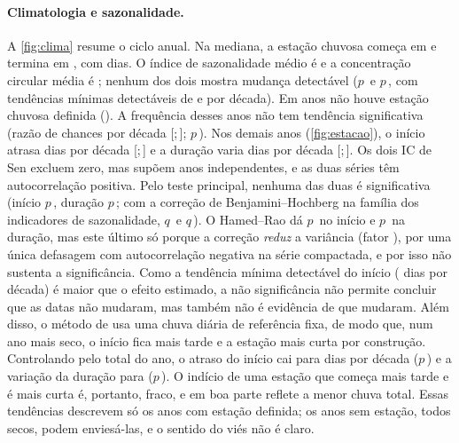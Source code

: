 \documentclass[11pt,a4paper]{article}
\newcommand{\IC}[2]{[#1;\,#2]}            %
\begin{document}
\paragraph{Climatologia e sazonalidade.} A \cref{fig:clima} resume o ciclo anual. Na mediana,
a estação chuvosa começa em \InicioMediano{} e termina em \FimMediano{}, com \DuracaoMediana{}
dias. O índice de sazonalidade médio é \SIMedio{} e a concentração circular média é
\ConcMedia{}; nenhum dos dois mostra mudança detectável ($p$\,\PTFPWSI{} e $p$\,\PTFPWConc, com
tendências mínimas detectáveis de \MDTSI{} e \MDTConc{} por década). Em \NanosSemEstacao{} anos não houve
estação chuvosa definida (\AnosSemEstacao). A frequência desses anos não tem tendência significativa
(razão de chances \ORSemEstacao{} por década \IC{\ORSemEstacaoICinf}{\ORSemEstacaoICsup};
$p$\,\PSemEstacao). Nos demais anos (\cref{fig:estacao}), o início atrasa \SenInicio{} dias por década
\IC{\SenInicioICinf}{\SenInicioICsup} e a duração varia \SenDuracao{} dias por década
\IC{\SenDuracaoICinf}{\SenDuracaoICsup}. Os dois IC de Sen excluem zero, mas supõem anos independentes,
e as duas séries têm autocorrelação positiva. Pelo teste principal, nenhuma das duas é significativa
(início $p$\,\PTFPWInicio, duração $p$\,\PTFPWDuracao; com a correção de Benjamini--Hochberg na família
dos indicadores de sazonalidade, $q$\,\QTesteInicio{} e $q$\,\QTesteDuracao). O Hamed--Rao dá
$p$\,\PHRInicio{} no início e $p$\,\PHRDuracao{} na duração, mas este último só porque a correção
\emph{reduz} a variância (fator \FatorHRDuracao{}), por uma única defasagem com autocorrelação negativa
na série compactada, e por isso não sustenta a significância. Como a tendência mínima detectável do
início (\MDTInicio{} dias por década) é maior que o efeito estimado, a não significância não permite
concluir que as datas não mudaram, mas também não é evidência de que mudaram. Além disso, o método de
\textcite{liebmann2007} usa uma chuva diária de referência fixa, de modo que, num ano mais seco, o
início fica mais tarde e a estação mais curta por construção. Controlando pelo total do ano, o atraso do
início cai para \SenInicioControleTotal{} dias por década ($p$\,\PInicioControleTotal) e a variação da
duração para \SenDuracaoControleTotal{} ($p$\,\PDuracaoControleTotal). O indício de uma estação que
começa mais tarde e é mais curta é, portanto, fraco, e em boa parte reflete a menor chuva total. Essas
tendências descrevem só os anos com estação definida; os anos sem estação, todos secos, podem
enviesá-las, e o sentido do viés não é claro.
\end{document}
